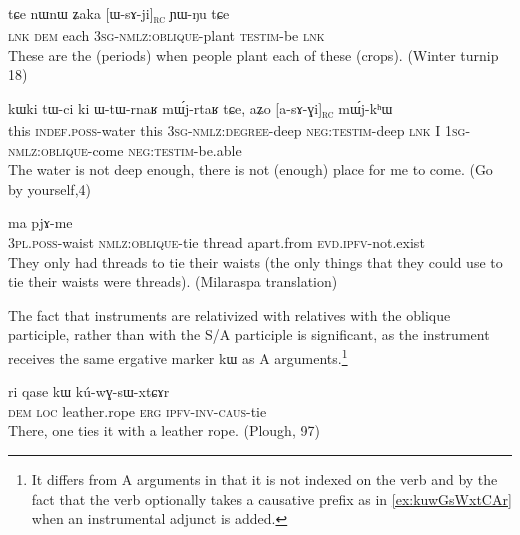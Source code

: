\documentclass[oldfontcommands,oneside,a4paper,11pt]{article}
\newcommand{\ipa}[1]{{\phon #1}} %
\newcommand{\rc}{\textsubscript{\textsc{rc}}}
\begin{document}
\begin{exe}
   \ex \label{ex:WsAji}
   \gll
   \ipa{tɕe} 	\ipa{nɯnɯ} 	\ipa{ʑaka} 	[\ipa{ɯ-sɤ-ji}]\rc{} 	\ipa{ɲɯ-ŋu} 	\ipa{tɕe}\\
   \textsc{lnk} \textsc{dem} each \textsc{3sg-nmlz:oblique}-plant \textsc{testim}-be \textsc{lnk}\\
\glt These are the (periods) when people plant each of these (crops). (Winter turnip 18)
\end{exe}

\begin{exe}
   \ex \label{ex:asAGi}
 \gll
\ipa{kɯki}   	\ipa{tɯ-ci}   	\ipa{ki}   	\ipa{ɯ-tɯ-rnaʁ}   	\ipa{mɯ́j-rtaʁ}   	\ipa{tɕe,}   	\ipa{aʑo}   	[\ipa{a-sɤ-ɣi}]\rc{}   	\ipa{mɯ́j-kʰɯ}   \\
this \textsc{indef.poss}-water this \textsc{3sg-nmlz:degree}-deep \textsc{neg:testim}-deep \textsc{lnk} I \textsc{1sg-nmlz:oblique}-come \textsc{neg:testim}-be.able \\
\glt The water is not deep enough, there is not (enough) place for me to come. (Go by yourself,4)
\end{exe}


 \begin{exe}
  \ex  \label{ex:sAxtCAr}  
  \gll [\ipa{nɯ-mtʰɤɣ}  	\ipa{sɤ-xtɕɤr}]  	\ipa{xɕɤfsa}  	\ipa{ma}  	\ipa{pjɤ-me}  \\
\textsc{3pl.poss}-waist \textsc{nmlz:oblique}-tie thread apart.from \textsc{evd.ipfv}-not.exist \\
\glt They only had threads to tie their waists (the only things that they could use to tie their waists were threads). (Milaraspa translation)
   \end{exe} 

The fact that instruments are relativized with relatives with the oblique participle, rather than with the S/A participle is significant, as the instrument receives the same ergative marker \ipa{kɯ} as A arguments.\footnote{It differs from A arguments in that it is not indexed on the verb and by the fact that the verb optionally takes a causative prefix as in \ref{ex:kuwGsWxtCAr}  when an instrumental adjunct is added.}

 \begin{exe}
  \ex   \label{ex:kuwGsWxtCAr}  
\gll \ipa{ɯnɯnɯ}  	\ipa{ri}  	\ipa{qase}  	\ipa{kɯ}  	\ipa{kú-wɣ-sɯ-xtɕɤr}  \\
\textsc{dem} \textsc{loc} leather.rope \textsc{erg} \textsc{ipfv-inv-caus}-tie \\
\glt There, one ties it with a leather rope. (Plough, 97)
   \end{exe} 
   
\end{document}
